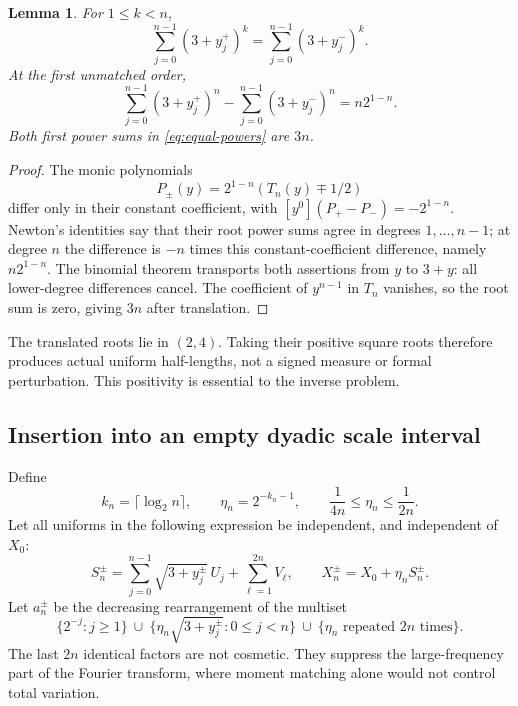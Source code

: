 \documentclass[11pt,a4paper]{article}
\newtheorem{lemma}[theorem]{Lemma}
\theoremstyle{definition}
\theoremstyle{remark}
\begin{document}
\begin{lemma}\label{lem:cheby-powers}
For $1\le k<n$,
\begin{equation}\label{eq:equal-powers}
 \sum_{j=0}^{n-1}(3+y_j^+)^k
 =\sum_{j=0}^{n-1}(3+y_j^-)^k.
\end{equation}
At the first unmatched order,
\begin{equation}\label{eq:leading-defect}
 \sum_{j=0}^{n-1}(3+y_j^+)^n
 -\sum_{j=0}^{n-1}(3+y_j^-)^n=n2^{1-n}.
\end{equation}
Both first power sums in \eqref{eq:equal-powers} are $3n$.
\end{lemma}

\begin{proof}
The monic polynomials
\[
 P_\pm(y)=2^{1-n}(T_n(y)\mp1/2)
\]
differ only in their constant coefficient, with
$[y^0](P_+-P_-)=-2^{1-n}$. Newton's identities say that their root power
sums agree in degrees $1,\ldots,n-1$; at degree $n$ the difference is
$-n$ times this constant-coefficient difference, namely $n2^{1-n}$.
The binomial theorem transports both assertions from $y$ to $3+y$:
all lower-degree differences cancel. The coefficient of $y^{n-1}$ in
$T_n$ vanishes, so the root sum is zero, giving $3n$ after translation.
\end{proof}

The translated roots lie in $(2,4)$. Taking their positive square roots
therefore produces actual uniform half-lengths, not a signed measure or
formal perturbation. This positivity is essential to the inverse problem.

\subsection{Insertion into an empty dyadic scale interval}

Define
\begin{equation}\label{eq:eta}
 k_n=\lceil\log_2 n\rceil,\qquad
 \eta_n=2^{-k_n-1},\qquad
 \frac1{4n}\le\eta_n\le\frac1{2n}.
\end{equation}
Let all uniforms in the following expression be independent, and independent
of $X_0$:
\begin{equation}\label{eq:S}
 S_n^\pm=
 \sum_{j=0}^{n-1}\sqrt{3+y_j^\pm}\,U_j
          +\sum_{\ell=1}^{2n}V_\ell,
 \qquad X_n^\pm=X_0+\eta_n S_n^\pm.
\end{equation}
Let $a_n^\pm$ be the decreasing rearrangement of the multiset
\begin{equation}\label{eq:spectra}
 \{2^{-j}:j\ge1\}
 \ \cup\ \{\eta_n\sqrt{3+y_j^\pm}:0\le j<n\}
 \ \cup\ \{\eta_n\text{ repeated }2n\text{ times}\}.
\end{equation}
The last $2n$ identical factors are not cosmetic. They suppress the
large-frequency part of the Fourier transform, where moment matching
alone would not control total variation.
\end{document}
